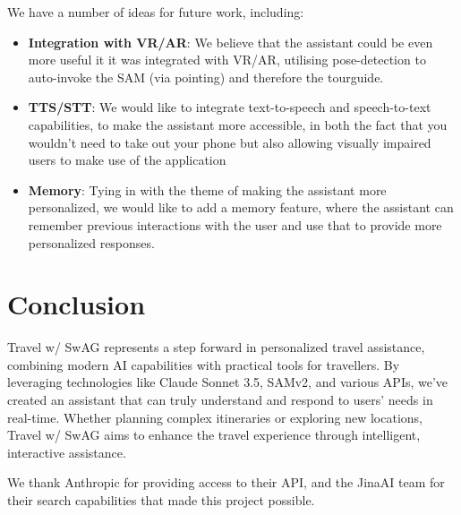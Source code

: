 \documentclass{article}
\begin{document}
We have a number of ideas for future work, including:

\begin{itemize}
\item \textbf{Integration with VR/AR}: We believe that the assistant could be even more useful it it was integrated with VR/AR, utilising pose-detection to auto-invoke the SAM (via pointing) and therefore the tourguide.
\item \textbf{TTS/STT}: We would like to integrate text-to-speech and speech-to-text capabilities, to make the assistant more accessible, in both the fact that you wouldn't need to take out your phone but also allowing visually impaired users to make use of the application
\item \textbf{Memory}: Tying in with the theme of making the assistant more personalized, we would like to add a memory feature, where the assistant can remember previous interactions with the user and use that to provide more personalized responses.
\end{itemize}

\section{Conclusion}

Travel w/ SwAG represents a step forward in personalized travel assistance, combining modern AI capabilities with practical tools for travellers. By leveraging technologies like Claude Sonnet 3.5, SAMv2, and various APIs, we've created an assistant that can truly understand and respond to users' needs in real-time. Whether planning complex itineraries or exploring new locations, Travel w/ SwAG aims to enhance the travel experience through intelligent, interactive assistance.

We thank Anthropic for providing access to their API, and the JinaAI team for their search capabilities that made this project possible.
\end{document}
